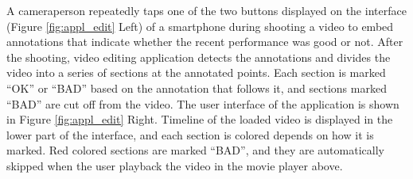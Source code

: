 A cameraperson repeatedly taps one of the two buttons displayed on the interface (Figure \ref{fig:appl_edit} Left) of a smartphone during shooting a video to embed annotations that indicate whether the recent performance was good or not.
After the shooting, video editing application detects the annotations and divides the video into a series of sections at the annotated points.
Each section is marked ``OK'' or ``BAD'' based on the annotation that follows it, and sections marked ``BAD'' are cut off from the video.
The user interface of the application is shown in Figure \ref{fig:appl_edit} Right.
Timeline of the loaded video is displayed in the lower part of the interface, and each section is colored depends on how it is marked.
Red colored sections are marked ``BAD'', and they are automatically skipped when the user playback the video in the movie player above.
